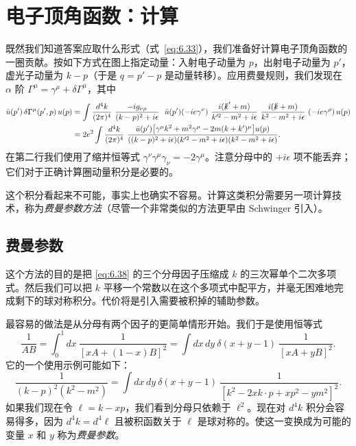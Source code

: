 \section{电子顶角函数：计算}

既然我们知道答案应取什么形式（式~\eqref{eq:6.33}），我们准备好计算电子顶角函数的一圈贡献。按如下方式在图上指定动量：入射电子动量为 $p$，出射电子动量为 $p'$，虚光子动量为 $k-p$（于是 $q = p'-p$ 是动量转移）。应用费曼规则，我们发现在 $\alpha$ 阶 $\Gamma^\mu = \gamma^\mu + \delta\Gamma^\mu$，其中
\begin{equation}
  \begin{aligned}
    \bar{u}(p')\,\delta\Gamma^\mu(p',p)\,u(p)
    &= \int \frac{d^4k}{(2\pi)^4}\
      \frac{-ig_{\nu\rho}}{(k-p)^2+i\epsilon}\ \
      \bar{u}(p')(-ie\gamma^\nu)\
      \frac{i(\slashed{k}'+m)}{k'^2-m^2+i\epsilon}\
      \frac{i(\slashed{k}+m)}{k^2-m^2+i\epsilon}\
      (-ie\gamma^\rho)\,u(p)\\
    &= 2e^2\int \frac{d^4k}{(2\pi)^4}\
      \frac{\bar{u}(p')\bigl[ \gamma^\mu k^2 + m^2\gamma^\mu
        - 2m(k+k')^\mu \bigr]u(p)}
      {((k-p)^2+i\epsilon)(k'^2-m^2+i\epsilon)(k^2-m^2+i\epsilon)} .
  \end{aligned}
  \label{eq:6.38}
\end{equation}
在第二行我们使用了缩并恒等式 $\gamma^\nu\gamma^\mu\gamma_\nu = -2\gamma^\mu$。注意分母中的 $+i\epsilon$ 项不能丢弃；它们对于正确计算圈动量积分是必要的。

这个积分看起来不可能，事实上也确实不容易。计算这类积分需要另一项计算技术，称为\emph{费曼参数方法}（尽管一个非常类似的方法更早由 Schwinger 引入）。

\subsection{费曼参数}

这个方法的目的是把 \eqref{eq:6.38} 的三个分母因子压缩成 $k$ 的三次幂单个二次多项式。然后我们可以把 $k$ 平移一个常数以在这个多项式中配平方，并毫无困难地完成剩下的球对称积分。代价将是引入需要被积掉的辅助参数。

最容易的做法是从分母有两个因子的更简单情形开始。我们于是使用恒等式
\begin{equation}
  \frac{1}{AB} = \int_0^1 dx\ \frac{1}{[xA+(1-x)B]^2}
    = \int dx\,dy\ \delta(x+y-1)\ \frac{1}{[xA+yB]^2} .
  \label{eq:6.39}
\end{equation}
它的一个使用示例可能如下：
\begin{equation}
  \frac{1}{(k-p)^2(k^2-m^2)}
  = \int dx\,dy\ \delta(x+y-1)\
    \frac{1}{[k^2 - 2xk\cdot p + xp^2 - ym^2]^2} .
\end{equation}
如果我们现在令 $\ell = k - xp$，我们看到分母只依赖于 $\ell^2$。现在对 $d^4k$ 积分会容易得多，因为 $d^4k = d^4\ell$ 且被积函数关于 $\ell$ 是球对称的。使这一变换成为可能的变量 $x$ 和 $y$ 称为\emph{费曼参数}。

